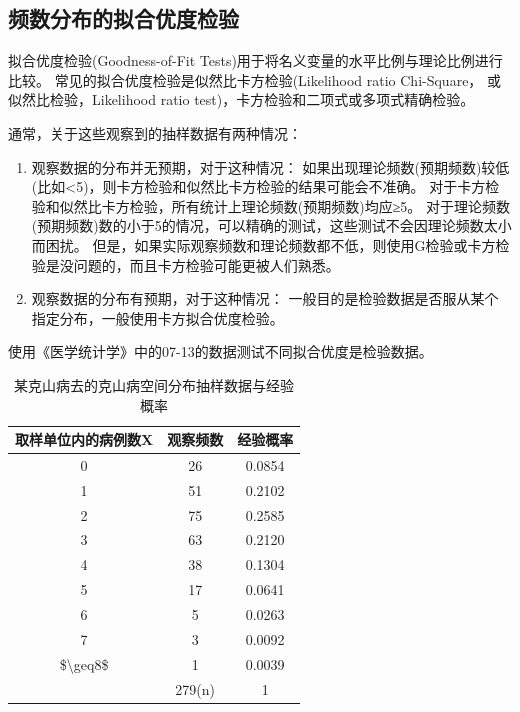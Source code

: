 \documentclass[
]{article}
\begin{document}
\hypertarget{ux9891ux6570ux5206ux5e03ux7684ux62dfux5408ux4f18ux5ea6ux68c0ux9a8c}{%
\subsection{频数分布的拟合优度检验}\label{ux9891ux6570ux5206ux5e03ux7684ux62dfux5408ux4f18ux5ea6ux68c0ux9a8c}}

拟合优度检验(Goodness-of-Fit Tests)用于将名义变量的水平比例与理论比例进行比较。 常见的拟合优度检验是似然比卡方检验(Likelihood ratio Chi-Square，
或似然比检验，Likelihood ratio test)，卡方检验和二项式或多项式精确检验。

通常，关于这些观察到的抽样数据有两种情况：

\begin{enumerate}
\def\labelenumi{\arabic{enumi}.}
\item
  观察数据的分布并无预期，对于这种情况：
  如果出现理论频数(预期频数)较低(比如\textless5)，则卡方检验和似然比卡方检验的结果可能会不准确。
  对于卡方检验和似然比卡方检验，所有统计上理论频数(预期频数)均应≥5。
  对于理论频数(预期频数)数的小于5的情况，可以精确的测试，这些测试不会因理论频数太小而困扰。
  但是，如果实际观察频数和理论频数都不低，则使用G检验或卡方检验是没问题的，而且卡方检验可能更被人们熟悉。
\item
  观察数据的分布有预期，对于这种情况：
  一般目的是检验数据是否服从某个指定分布，一般使用卡方拟合优度检验。
\end{enumerate}

使用《医学统计学》中的07-13的数据测试不同拟合优度是检验数据。

\begin{table}

\caption{\label{tab:chisqtab10}某克山病去的克山病空间分布抽样数据与经验概率}
\centering
\begin{tabular}[t]{ccc}
\toprule
取样单位内的病例数X & 观察频数 & 经验概率\\
\midrule
0 & 26 & 0.0854\\
1 & 51 & 0.2102\\
2 & 75 & 0.2585\\
3 & 63 & 0.2120\\
4 & 38 & 0.1304\\
5 & 17 & 0.0641\\
6 & 5 & 0.0263\\
7 & 3 & 0.0092\\
\$\textbackslash{}geq8\$ & 1 & 0.0039\\
 & 279(n) & 1\\
\bottomrule
\end{tabular}
\end{table}
\end{document}
